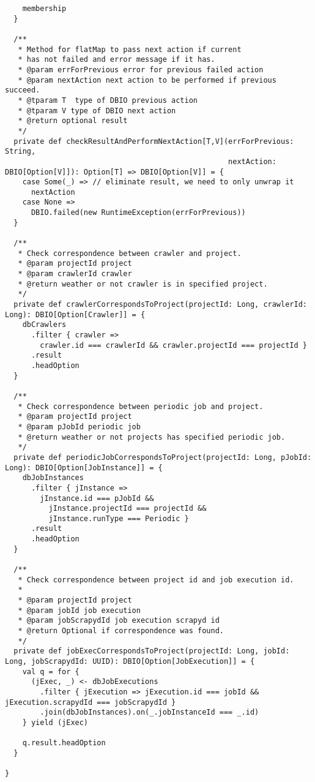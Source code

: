 \begin{lstlisting}
    membership
  }

  /**
   * Method for flatMap to pass next action if current
   * has not failed and error message if it has.
   * @param errForPrevious error for previous failed action
   * @param nextAction next action to be performed if previous succeed.
   * @tparam T  type of DBIO previous action
   * @tparam V type of DBIO next action
   * @return optional result
   */
  private def checkResultAndPerformNextAction[T,V](errForPrevious: String,
                                                   nextAction: DBIO[Option[V]]): Option[T] => DBIO[Option[V]] = {
    case Some(_) => // eliminate result, we need to only unwrap it
      nextAction
    case None =>
      DBIO.failed(new RuntimeException(errForPrevious))
  }

  /**
   * Check correspondence between crawler and project.
   * @param projectId project
   * @param crawlerId crawler
   * @return weather or not crawler is in specified project.
   */
  private def crawlerCorrespondsToProject(projectId: Long, crawlerId: Long): DBIO[Option[Crawler]] = {
    dbCrawlers
      .filter { crawler =>
        crawler.id === crawlerId && crawler.projectId === projectId }
      .result
      .headOption
  }

  /**
   * Check correspondence between periodic job and project.
   * @param projectId project
   * @param pJobId periodic job
   * @return weather or not projects has specified periodic job.
   */
  private def periodicJobCorrespondsToProject(projectId: Long, pJobId: Long): DBIO[Option[JobInstance]] = {
    dbJobInstances
      .filter { jInstance =>
        jInstance.id === pJobId &&
          jInstance.projectId === projectId &&
          jInstance.runType === Periodic }
      .result
      .headOption
  }

  /**
   * Check correspondence between project id and job execution id.
   *
   * @param projectId project
   * @param jobId job execution
   * @param jobScrapydId job execution scrapyd id
   * @return Optional if correspondence was found.
   */
  private def jobExecCorrespondsToProject(projectId: Long, jobId: Long, jobScrapydId: UUID): DBIO[Option[JobExecution]] = {
    val q = for {
      (jExec, _) <- dbJobExecutions
        .filter { jExecution => jExecution.id === jobId && jExecution.scrapydId === jobScrapydId }
        .join(dbJobInstances).on(_.jobInstanceId === _.id)
    } yield (jExec)

    q.result.headOption
  }

}
\end{lstlisting}
